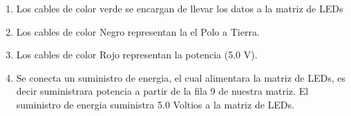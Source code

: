 \documentclass{article}
\begin{document}
\begin{enumerate}
    \item Los cables de color verde se encargan de llevar los datos a la matriz de LEDs
    \item Los cables de color Negro representan la el Polo a Tierra.
    \item Los cables de color Rojo representan la potencia (5.0 V).
    \item Se conecta un suministro de energia, el cual alimentara la matriz de LEDs, es decir suministrara potencia a partir de la fila 9 de nuestra matriz. El suministro de energia suministra 5.0 Voltios a la matriz de LEDs.
\end{enumerate}


\end{document}
